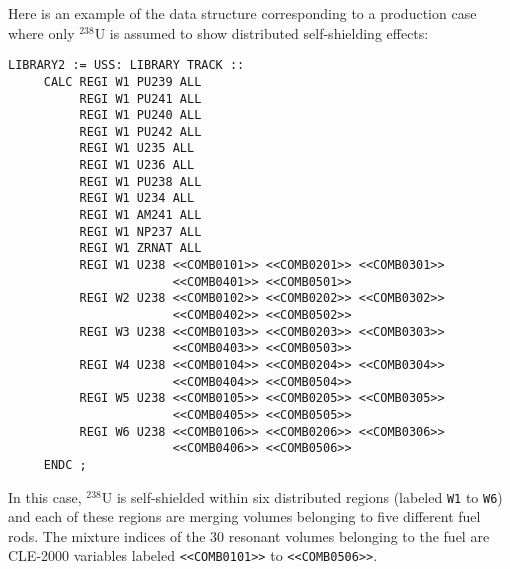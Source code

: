 \vskip 0.15cm

Here is an example of the data structure corresponding to a production case where
only $^{238}$U is assumed to show distributed self-shielding effects:

\begin{verbatim}
LIBRARY2 := USS: LIBRARY TRACK ::
     CALC REGI W1 PU239 ALL
          REGI W1 PU241 ALL
          REGI W1 PU240 ALL
          REGI W1 PU242 ALL
          REGI W1 U235 ALL
          REGI W1 U236 ALL
          REGI W1 PU238 ALL
          REGI W1 U234 ALL
          REGI W1 AM241 ALL
          REGI W1 NP237 ALL
          REGI W1 ZRNAT ALL
          REGI W1 U238 <<COMB0101>> <<COMB0201>> <<COMB0301>>
                       <<COMB0401>> <<COMB0501>>
          REGI W2 U238 <<COMB0102>> <<COMB0202>> <<COMB0302>>
                       <<COMB0402>> <<COMB0502>>
          REGI W3 U238 <<COMB0103>> <<COMB0203>> <<COMB0303>>
                       <<COMB0403>> <<COMB0503>>
          REGI W4 U238 <<COMB0104>> <<COMB0204>> <<COMB0304>>
                       <<COMB0404>> <<COMB0504>>
          REGI W5 U238 <<COMB0105>> <<COMB0205>> <<COMB0305>>
                       <<COMB0405>> <<COMB0505>>
          REGI W6 U238 <<COMB0106>> <<COMB0206>> <<COMB0306>>
                       <<COMB0406>> <<COMB0506>>
     ENDC ;
\end{verbatim}

\vskip 0.15cm

In this case, $^{238}$U is self-shielded within six distributed regions (labeled
{\tt W1} to {\tt W6}) and each of these regions are merging volumes belonging
to five different fuel rods. The mixture indices of the 30 resonant volumes belonging
to the fuel are CLE-2000 variables labeled {\tt <<COMB0101>>} to {\tt <<COMB0506>>}.

\eject

